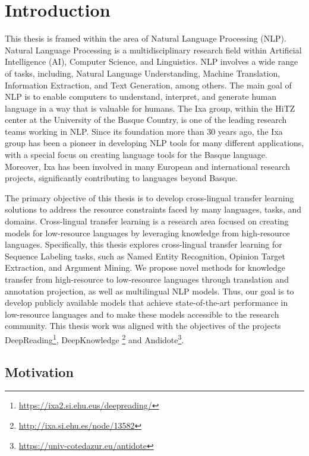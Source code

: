 \chapter[Introduction]{Introduction}
\label{ch:instroduction}

This thesis is framed within the area of Natural Language Processing (NLP). Natural Language Processing is a multidisciplinary research field within Artificial Intelligence (AI), Computer Science, and Linguistics. NLP involves a wide range of tasks, including, Natural Language Understanding, Machine Translation, Information Extraction, and Text Generation, among others. The main goal of NLP is to enable computers to understand, interpret, and generate human language in a way that is valuable for humans. The Ixa group, within the HiTZ center at the University of the Basque Country, is one of the leading research teams working in NLP. Since its foundation more than 30 years ago, the Ixa group has been a pioneer in developing NLP tools for many different applications, with a special focus on creating language tools for the Basque language. Moreover, Ixa has been involved in many European and international research projects, significantly contributing to languages beyond Basque.

The primary objective of this thesis is to develop cross-lingual transfer learning solutions to address the resource constraints faced by many languages, tasks, and domains. Cross-lingual transfer learning is a research area focused on creating models for low-resource languages by leveraging knowledge from high-resource languages. Specifically, this thesis explores cross-lingual transfer learning for Sequence Labeling tasks, such as Named Entity Recognition, Opinion Target Extraction, and Argument Mining. We propose novel methods for knowledge transfer from high-resource to low-resource languages through translation and annotation projection, as well as multilingual NLP models. Thus, our goal is to develop publicly available models that achieve state-of-the-art performance in low-resource languages and to make these models accessible to the research community. This thesis work was aligned with the objectives of the projects DeepReading\footnote{\url{https://ixa2.si.ehu.eus/deepreading/}}, DeepKnowledge \footnote{\url{http://ixa.si.ehu.es/node/13582}} and Andidote\footnote{\url{https://univ-cotedazur.eu/antidote}}.


\section{Motivation}
\label{motivation}

